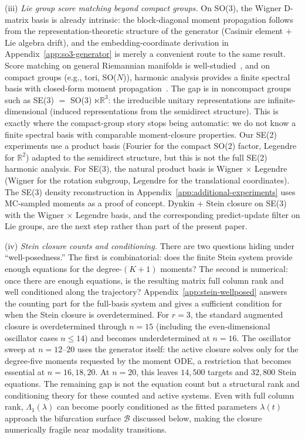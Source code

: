 \documentclass{article}
\newcommand{\R}{\mathbb{R}}
\theoremstyle{definition}
\begin{document}
(iii) \emph{Lie group score matching beyond compact groups.}
On SO(3), the Wigner D-matrix basis is already intrinsic:
the block-diagonal moment propagation follows from the
representation-theoretic structure of the generator
(Casimir element $+$ Lie algebra drift), and the embedding-coordinate
derivation in Appendix~\ref{app:so3-generator} is merely a
convenient route to the same result.
Score matching on general Riemannian manifolds is
well-studied~\cite{debortoli2022riemannian},
and on compact groups (e.g., tori, SO($N$)),
harmonic analysis provides a finite spectral basis with
closed-form moment propagation~\cite{wang2022lie}.
The gap is in noncompact groups such as SE(3) $=$ SO(3) $\ltimes \R^3$:
the irreducible unitary representations are infinite-dimensional
(induced representations from the semidirect structure).
This is exactly where the compact-group story stops being automatic:
we do not know a finite spectral basis with comparable moment-closure
properties.
Our SE(2) experiments use a product basis
(Fourier for the compact SO(2) factor, Legendre for $\R^2$)
adapted to the semidirect structure, but this is not the full SE(2)
harmonic analysis.
For SE(3), the natural product basis is Wigner $\times$ Legendre
(Wigner for the rotation subgroup, Legendre for the translational
coordinates).
The SE(3) density reconstruction in
Appendix~\ref{app:additional-experiments}
uses MC-sampled moments as a proof of concept.
Dynkin + Stein closure on SE(3) with the Wigner $\times$ Legendre basis,
and the corresponding predict-update filter on Lie groups, are the
next step rather than part of the present paper.

(iv) \emph{Stein closure counts and conditioning.}
There are two questions hiding under ``well-posedness.''
The first is combinatorial: does the finite Stein system provide enough
equations for the degree-$(K{+}1)$ moments?
The second is numerical: once there are enough equations, is the
resulting matrix full column rank and well conditioned along the
trajectory?
Appendix~\ref{app:stein-wellposed} answers the counting part for the
full-basis system and gives a sufficient condition for when the Stein
closure is overdetermined.
For $r{=}3$, the standard augmented closure is overdetermined through
$n{=}15$ (including the even-dimensional oscillator cases
$n \le 14$) and becomes underdetermined at $n{=}16$.
The oscillator sweep at $n{=}12$--$20$ uses the generator itself:
the active closure solves only for the degree-five moments requested
by the moment ODE, a restriction that becomes essential at
$n{=}16,18,20$.
At $n{=}20$, this leaves $14{,}500$ targets and $32{,}800$ Stein
equations.
The remaining gap is not the equation count but a structural rank and
conditioning theory for these counted and active systems.
Even with full column rank, $\Lambda_1(\lambda)$ can become poorly
conditioned as the fitted parameters $\lambda(t)$ approach the
bifurcation surface $\mathcal{B}$ discussed below, making the closure
numerically fragile near modality transitions.
\end{document}
